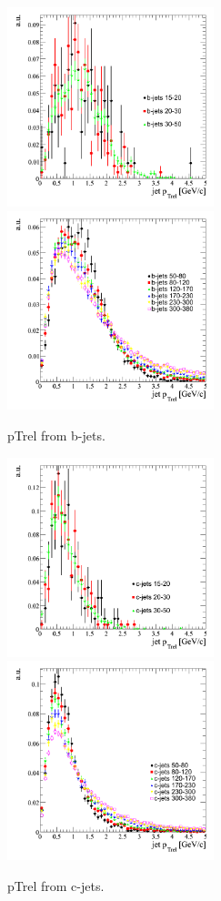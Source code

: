 \begin{figure}[htbp]
  \begin{center}
    \includegraphics[width=60mm]{Figures/jet_ptrel_qcdbinned.png}
    \includegraphics[width=60mm]{Figures/jet_ptrel2qcdbinned.png}
  \end{center}
  \caption{pTrel from b-jets.}
  \label{fig:jet_ptrel}
\end{figure}

\begin{figure}[htbp]
  \begin{center}
    \includegraphics[width=60mm]{Figures/jet_ptrelcqcdbinned.png}
    \includegraphics[width=60mm]{Figures/jet_ptrelcqcdbinned2.png}
  \end{center}
  \caption{pTrel from c-jets.}
  \label{fig:jet_ptrel}
\end{figure}


